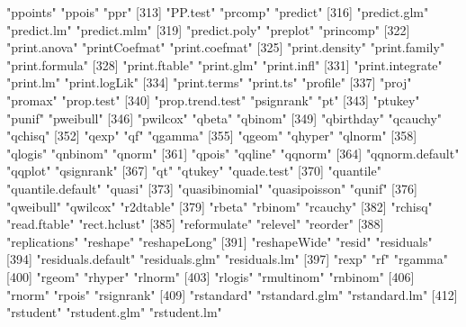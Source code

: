 \documentclass[tutorial.tex]{subfiles}
\begin{document}
\begin{Schunk}
\begin{Soutput}
[310] "ppoints"              "ppois"                "ppr"                 
[313] "PP.test"              "prcomp"               "predict"             
[316] "predict.glm"          "predict.lm"           "predict.mlm"         
[319] "predict.poly"         "preplot"              "princomp"            
[322] "print.anova"          "printCoefmat"         "print.coefmat"       
[325] "print.density"        "print.family"         "print.formula"       
[328] "print.ftable"         "print.glm"            "print.infl"          
[331] "print.integrate"      "print.lm"             "print.logLik"        
[334] "print.terms"          "print.ts"             "profile"             
[337] "proj"                 "promax"               "prop.test"           
[340] "prop.trend.test"      "psignrank"            "pt"                  
[343] "ptukey"               "punif"                "pweibull"            
[346] "pwilcox"              "qbeta"                "qbinom"              
[349] "qbirthday"            "qcauchy"              "qchisq"              
[352] "qexp"                 "qf"                   "qgamma"              
[355] "qgeom"                "qhyper"               "qlnorm"              
[358] "qlogis"               "qnbinom"              "qnorm"               
[361] "qpois"                "qqline"               "qqnorm"              
[364] "qqnorm.default"       "qqplot"               "qsignrank"           
[367] "qt"                   "qtukey"               "quade.test"          
[370] "quantile"             "quantile.default"     "quasi"               
[373] "quasibinomial"        "quasipoisson"         "qunif"               
[376] "qweibull"             "qwilcox"              "r2dtable"            
[379] "rbeta"                "rbinom"               "rcauchy"             
[382] "rchisq"               "read.ftable"          "rect.hclust"         
[385] "reformulate"          "relevel"              "reorder"             
[388] "replications"         "reshape"              "reshapeLong"         
[391] "reshapeWide"          "resid"                "residuals"           
[394] "residuals.default"    "residuals.glm"        "residuals.lm"        
[397] "rexp"                 "rf"                   "rgamma"              
[400] "rgeom"                "rhyper"               "rlnorm"              
[403] "rlogis"               "rmultinom"            "rnbinom"             
[406] "rnorm"                "rpois"                "rsignrank"           
[409] "rstandard"            "rstandard.glm"        "rstandard.lm"        
[412] "rstudent"             "rstudent.glm"         "rstudent.lm"         

\end{Soutput}
\end{Schunk}
\end{document}
